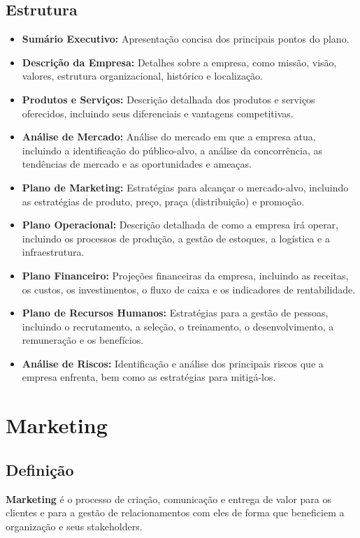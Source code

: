 \documentclass{article}
\begin{document}
\subsection{Estrutura}
\begin{itemize}
    \item \textbf{Sumário Executivo:} Apresentação concisa dos principais pontos do plano.
    \item \textbf{Descrição da Empresa:} Detalhes sobre a empresa, como missão, visão, valores, estrutura organizacional, histórico e localização.
    \item \textbf{Produtos e Serviços:} Descrição detalhada dos produtos e serviços oferecidos, incluindo seus diferenciais e vantagens competitivas.
    \item \textbf{Análise de Mercado:} Análise do mercado em que a empresa atua, incluindo a identificação do público-alvo, a análise da concorrência, as tendências de mercado e as oportunidades e ameaças.
    \item \textbf{Plano de Marketing:} Estratégias para alcançar o mercado-alvo, incluindo as estratégias de produto, preço, praça (distribuição) e promoção.
    \item \textbf{Plano Operacional:} Descrição detalhada de como a empresa irá operar, incluindo os processos de produção, a gestão de estoques, a logística e a infraestrutura.
    \item \textbf{Plano Financeiro:} Projeções financeiras da empresa, incluindo as receitas, os custos, os investimentos, o fluxo de caixa e os indicadores de rentabilidade.
    \item \textbf{Plano de Recursos Humanos:} Estratégias para a gestão de pessoas, incluindo o recrutamento, a seleção, o treinamento, o desenvolvimento, a remuneração e os benefícios.
    \item \textbf{Análise de Riscos:} Identificação e análise dos principais riscos que a empresa enfrenta, bem como as estratégias para mitigá-los.
\end{itemize}

\section{Marketing}

\subsection{Definição}
\textbf{Marketing} é o processo de criação, comunicação e entrega de valor para os clientes e para a gestão de relacionamentos com eles de forma que beneficiem a organização e seus stakeholders.
\end{document}
